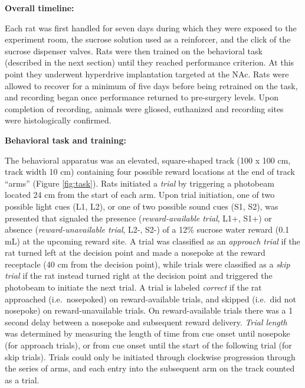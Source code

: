 \documentclass[11pt]{article}
\begin{document}
{\bf Overall timeline:}

Each rat was first handled for seven days during which they were
exposed to the experiment room, the sucrose solution used as a
reinforcer, and the click of the sucrose dispenser valves. Rats were
then trained on the behavioral task (described in the next section)
until they reached performance criterion. At this point they
underwent hyperdrive implantation targeted at the NAc. Rats were
allowed to recover for a minimum of five days before being retrained
on the task, and recording began once performance returned to
pre-surgery levels. Upon completion of recording, animals were gliosed,
euthanized and recording sites were histologically confirmed.

{\bf Behavioral task and training:}

The behavioral apparatus was an elevated, square-shaped track (100 x
100 cm, track width 10 cm) containing four possible reward locations
at the end of track ``arms'' (Figure \ref{fig:task}). Rats initiated a
{\it trial} by triggering a photobeam located 24 cm from the start of
each arm. Upon trial initiation, one of two possible light cues (L1,
L2), or one of two possible sound cues (S1, S2), was presented that
signaled the presence ({\it reward-available trial}, L1+, S1+) or
absence ({\it reward-unavailable trial}, L2-, S2-) of a 12\% sucrose
water reward (0.1 mL) at the upcoming reward site. A trial was
classified as an {\it approach trial} if the rat turned left at the
decision point and made a nosepoke at the reward receptacle (40 cm
from the decision point), while trials were classified as a {\it skip
trial} if the rat instead turned right at the decision point and
triggered the photobeam to initiate the next trial. A trial is labeled
{\it correct} if the rat approached (i.e.\ nosepoked) on
reward-available trials, and skipped (i.e.\ did not nosepoke) on
reward-unavailable trials. On reward-available trials there was a 1
second delay between a nosepoke and subsequent reward delivery. {\it
Trial length} was determined by measuring the length of time from
cue onset until nosepoke (for approach trials), or from cue onset
until the start of the following trial (for skip trials). Trials could
only be initiated through clockwise progression through the series of
arms, and each entry into the subsequent arm on the track counted as a
trial.
\end{document}
